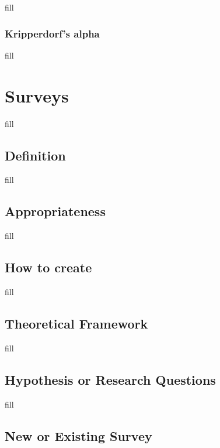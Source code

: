 \documentclass[
  b5paper]{book}
\begin{document}
fill

\hypertarget{kripperdorfs-alpha}{%
\subsection*{Kripperdorf's alpha}\label{kripperdorfs-alpha}}

fill

\hypertarget{surveys-1}{%
\chapter{Surveys}\label{surveys-1}}

fill

\hypertarget{definition}{%
\section{Definition}\label{definition}}

fill

\hypertarget{appropriateness}{%
\section{Appropriateness}\label{appropriateness}}

fill

\hypertarget{how-to-create}{%
\section{How to create}\label{how-to-create}}

fill

\hypertarget{theoretical-framework}{%
\section{Theoretical Framework}\label{theoretical-framework}}

fill

\hypertarget{hypothesis-or-research-questions}{%
\section{Hypothesis or Research Questions}\label{hypothesis-or-research-questions}}

fill

\hypertarget{new-or-existing-survey}{%
\section{New or Existing Survey}\label{new-or-existing-survey}}
\end{document}
